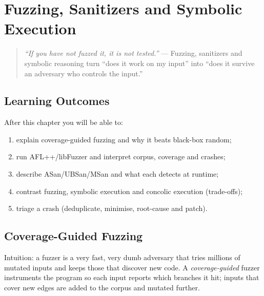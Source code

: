 \chapter{Fuzzing, Sanitizers and Symbolic Execution}
\label{ch:fuzzing}

\begin{quote}
\emph{``If you have not fuzzed it, it is not tested.''} --- Fuzzing, sanitizers and symbolic reasoning turn ``does it work on my input'' into ``does it survive an adversary who controls the input.''
\end{quote}

\noindent{}
\vspace{0.4em}

\section*{Learning Outcomes}
After this chapter you will be able to:
\begin{enumerate}[label=(L\arabic*)]
    \item explain coverage-guided fuzzing and why it beats black-box random;
    \item run AFL++/libFuzzer and interpret corpus, coverage and crashes;
    \item describe ASan/UBSan/MSan and what each detects at runtime;
    \item contrast fuzzing, symbolic execution and concolic execution (trade-offs);
    \item triage a crash (deduplicate, minimise, root-cause and patch).
\end{enumerate}

\section{Coverage-Guided Fuzzing}
\label{sec:fuzzing}
Intuition: a fuzzer is a very fast, very dumb adversary that tries millions of mutated inputs and keeps those that discover new code. A \emph{coverage-guided} fuzzer instruments the program so each input reports which branches it hit; inputs that cover new edges are added to the corpus and mutated further.

